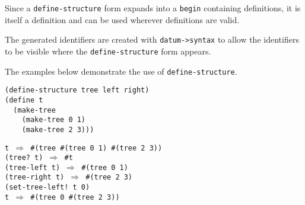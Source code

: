 Since a \texttt{define-structure} form expands into a \texttt{begin} containing
definitions, it is itself a definition and can be used wherever
definitions are valid.


The generated identifiers are created with
\label{syntax_s71}\texttt{datum-\textgreater{}syntax} to allow the identifiers to be visible
where the \texttt{define-structure} form appears.


The examples below demonstrate the use of \texttt{define-structure}.


\begin{alltt}
(define-structure tree left right)
(define t
  (make-tree
    (make-tree 0 1)
    (make-tree 2 3)))

t \(\Rightarrow\) \#{}(tree \#{}(tree 0 1) \#{}(tree 2 3))
(tree? t) \(\Rightarrow\) \#{}t
(tree-left t) \(\Rightarrow\) \#{}(tree 0 1)
(tree-right t) \(\Rightarrow\) \#{}(tree 2 3)
(set-tree-left! t 0)
t \(\Rightarrow\) \#{}(tree 0 \#{}(tree 2 3))
\end{alltt}



